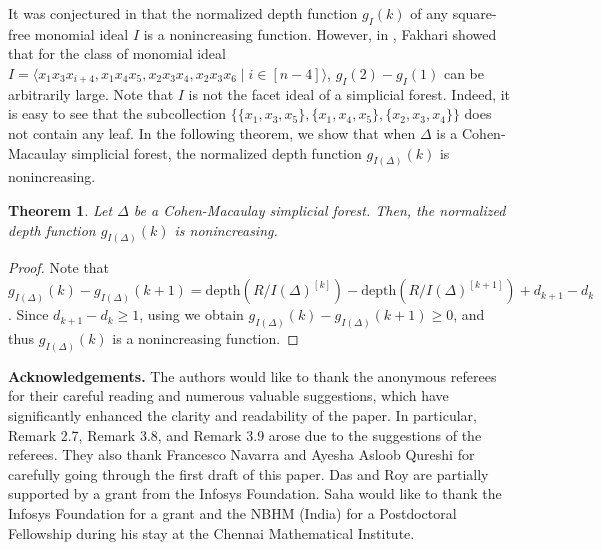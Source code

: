 \documentclass[12pt,a4paper,reqno]{amsart}
\newtheorem{theorem}[proposition]{Theorem}
\theoremstyle{definition}
\def\d{\mathrm{depth}}
\def\l{\langle}
\def\r{\rangle}
\begin{document}
It was conjectured in \cite{EHHM12} that the normalized depth function $g_I(k)$ of any square-free monomial ideal $I$ is a nonincreasing function. However, in \cite{Fakhari_increasing}, Fakhari showed that for the class of monomial ideal $I=\l x_1x_3x_{i+4},x_1x_4x_5,x_2x_3x_4,x_2x_3x_6\mid i\in[n-4]\r$, $g_I(2)-g_I(1)$ can be arbitrarily large. Note that $I$ is not the facet ideal of a simplicial forest. Indeed, it is easy to see that the subcollection $\{\{x_1,x_3,x_5\},\{x_1,x_4,x_5\},\{x_2,x_3,x_4\}\}$ does not contain any leaf. In the following theorem, we show that when $\Delta$ is a Cohen-Macaulay simplicial forest, the normalized depth function $g_{I(\Delta)}(k)$ is nonincreasing.  
\begin{theorem}\label{normalised depth}
    Let $\Delta$ be a Cohen-Macaulay simplicial forest. Then, the normalized depth function $g_{I(\Delta)}(k)$ is nonincreasing.
\end{theorem}
\begin{proof}
    Note that $g_{I(\Delta)}(k)-g_{I(\Delta)}(k+1)=\d(R/I(\Delta)^{[k]})-\d(R/I(\Delta)^{[k+1]})+d_{k+1}-d_k$. Since $d_{k+1}-d_k\ge 1$, using  we obtain $g_{I(\Delta)}(k)-g_{I(\Delta)}(k+1)\ge 0$, and thus $g_{I(\Delta)}(k)$ is a nonincreasing function. 
\end{proof}

\noindent
\textbf{Acknowledgements.} The authors would like to thank the anonymous referees for their careful reading and numerous valuable suggestions, which have significantly enhanced the clarity and readability of the paper. In particular, Remark 2.7, Remark 3.8, and Remark 3.9 arose due to the suggestions of the referees. They also thank Francesco Navarra and Ayesha Asloob Qureshi for carefully going through the first draft of this paper. Das and Roy are partially supported by a grant from the Infosys Foundation. Saha would like to thank the Infosys Foundation for a grant and the NBHM (India) for a Postdoctoral Fellowship during his stay at the Chennai Mathematical Institute.


\end{document}
